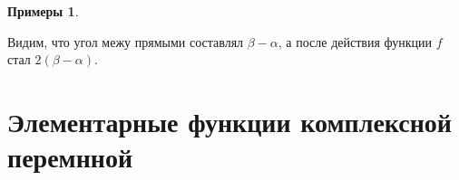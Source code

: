 \documentclass[11pt,openany,a4paper]{scrartcl}
\theoremstyle{plain}
\theoremstyle{definition}
\newtheorem{examples}[theorem]{Примеры}
\begin{document}
\begin{examples}
\begin{itemize}
\begin{center}
	\end{center}
	Видим, что угол межу прямыми составлял $\beta - \alpha$, а после действия функции $f$ стал $2(\beta - \alpha)$.
\end{itemize}	
\end{examples}

\section{Элементарные функции комплексной перемнной}
\end{document}
